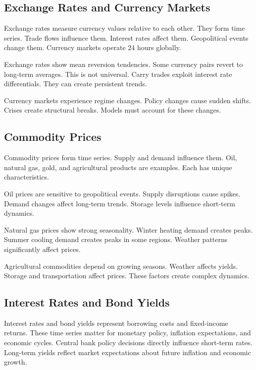 \subsection{Exchange Rates and Currency Markets}

Exchange rates measure currency values relative to each other. They form time series. Trade flows influence them. Interest rates affect them. Geopolitical events change them. Currency markets operate 24 hours globally.

Exchange rates show mean reversion tendencies. Some currency pairs revert to long-term averages. This is not universal. Carry trades exploit interest rate differentials. They can create persistent trends.

Currency markets experience regime changes. Policy changes cause sudden shifts. Crises create structural breaks. Models must account for these changes.

\subsection{Commodity Prices}

Commodity prices form time series. Supply and demand influence them. Oil, natural gas, gold, and agricultural products are examples. Each has unique characteristics.

Oil prices are sensitive to geopolitical events. Supply disruptions cause spikes. Demand changes affect long-term trends. Storage levels influence short-term dynamics.

Natural gas prices show strong seasonality. Winter heating demand creates peaks. Summer cooling demand creates peaks in some regions. Weather patterns significantly affect prices.

Agricultural commodities depend on growing seasons. Weather affects yields. Storage and transportation affect prices. These factors create complex dynamics.

\subsection{Interest Rates and Bond Yields}

Interest rates and bond yields represent borrowing costs and fixed-income returns. These time series matter for monetary policy, inflation expectations, and economic cycles. Central bank policy decisions directly influence short-term rates. Long-term yields reflect market expectations about future inflation and economic growth.

